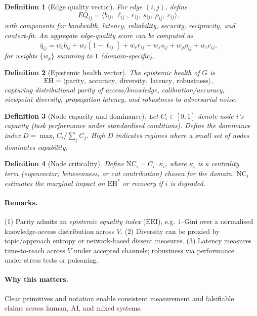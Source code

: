 \documentclass[12pt]{article}
\newcommand{\EEI}{\ensuremath{\mathrm{EEI}}}
\newcommand{\EH}{\ensuremath{\mathrm{EH}}}
\newtheorem{definition}{Definition}
\begin{document}
\begin{definition}[Edge quality vector]\label{def:eq}
For edge $(i,j)$, define
\[
 EQ_{ij}=\langle b_{ij},\ \ell_{ij},\ r_{ij},\ s_{ij},\ \rho_{ij},\ c_{ij}\rangle,
\]
with components for bandwidth, latency, reliability, security, reciprocity, and context-fit. An aggregate edge-quality score can be computed as
\[
 \bar{q}_{ij}=w_b b_{ij}+w_\ell (1-\ell_{ij})+w_r r_{ij}+w_s s_{ij}+w_\rho \rho_{ij}+w_c c_{ij},
\]
for weights $\{w_k\}$ summing to $1$ (domain-specific).
\end{definition}

\begin{definition}[Epistemic health vector]\label{def:eh}
The \emph{epistemic health} of $G$ is
\[
 \EH=\langle \text{parity},\ \text{accuracy},\ \text{diversity},\ \text{latency},\ \text{robustness}\rangle,
\]
capturing distributional parity of access/knowledge, calibration/accuracy, viewpoint diversity, propagation latency, and robustness to adversarial noise.
\end{definition}

\begin{definition}[Node capacity and dominance]\label{def:capacity}
Let $C_i\in[0,1]$ denote node $i$'s capacity (task performance under standardised conditions). Define the \emph{dominance index} $D=\max_i C_i/\sum_j C_j$. High $D$ indicates regimes where a small set of nodes dominates capability.
\end{definition}

\begin{definition}[Node criticality]\label{def:criticality}
Define $\mathrm{NC}_i=C_i \cdot \kappa_i$, where $\kappa_i$ is a centrality term (eigenvector, betweenness, or cut contribution) chosen for the domain. $\mathrm{NC}_i$ estimates the marginal impact on $\EH^{\ast}$ or recovery if $i$ is degraded.
\end{definition}

\paragraph{Remarks.}
(1) Parity admits an \emph{epistemic equality index} (\EEI), e.g. $1$--Gini over a normalised knowledge-access distribution across $V$. (2) Diversity can be proxied by topic/approach entropy or network-based dissent measures. (3) Latency measures time-to-reach across $V$ under accepted channels; robustness via performance under stress tests or poisoning.

\paragraph{Why this matters.}
Clear primitives and notation enable consistent measurement and falsifiable claims across human, AI, and mixed systems.
\end{document}
